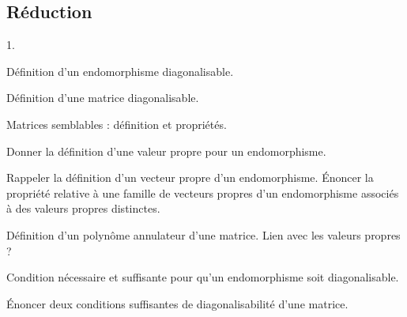 \documentclass[11pt]{article}%
\begin{document}
\subsection*{Réduction}

\begin{noliste}{1.}
\item Définition d'un endomorphisme diagonalisable.
\item Définition d'une matrice diagonalisable.
\item Matrices semblables : définition et propriétés.
\item Donner la définition d'une valeur propre pour un endomorphisme.
\item Rappeler la définition d'un vecteur propre d'un
  endomorphisme. Énoncer la propriété relative à une famille de
  vecteurs propres d'un endomorphisme associés à des valeurs propres
  distinctes.
\item Définition d'un polynôme annulateur d'une matrice. Lien avec les
  valeurs propres ?
\item Condition nécessaire et suffisante pour qu'un endomorphisme soit
  diagonalisable.
\item \'Enoncer deux conditions suffisantes de diagonalisabilité d'une matrice.
\end{noliste}
\end{document}
